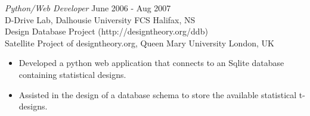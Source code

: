 \documentclass[line,margin]{res}
\begin{document}
\begin{resume}
    {\sl Python/Web Developer} \hfill June 2006 - Aug 2007 \\
    D-Drive Lab, Dalhousie University FCS \hfill Halifax, NS \\
    Design Database Project (http://designtheory.org/ddb)\\
    Satellite Project of designtheory.org, 
    Queen Mary University \hfill London, UK \smallskip
        \begin{itemize}  \itemsep -2pt %
    \item Developed a python web application that connects to an Sqlite
    database \\ containing statistical designs.
    \item Assisted in the design of a database schema to store the available
    statistical t-designs.
        \end{itemize}

\end{resume}

\newpage

\address{3139 Veith St., Halifax, NS B3K 3G9}
\address{(902) 489-2557 or (902) 444-4974}
\end{document}
